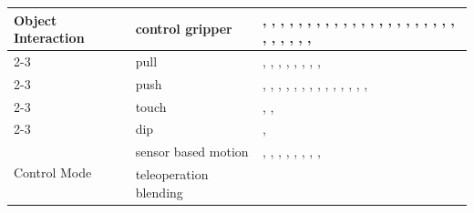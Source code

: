 \begin{table}[!h]
\begin{tabular}{|p{4cm}|p{5cm}|p{15cm}|}
\hline
\multirow{5}{*}{\parbox{3cm}{Object Interaction}}
    & control gripper                 & \cite{Mitrevski2019LucyTT}, \cite{Zhao2025ACL}, \cite{Nguyen2012AutonomouslyLT}, \cite{Stckler2013IncreasingFO}, \cite{Andersen2017IntegrationOA}, \cite{Rodehutskors2015IntuitiveBT}, \cite{Pedersen2014IntuitiveSP}, \cite{Orsula2022LearningTG}, \cite{Pohl2024MAkEableMA}, \cite{Groth2013MultitaskingOC}, \cite{Toner2024PRFAP}, \cite{Zhao2025ReactiveWL}, \cite{Huang2023SkillTA}, \cite{Diab2020SkillMaNA}, \cite{Schwarz2018TeamNA}, \cite{Thakar2018TowardsTT}, \cite{Nagatani1996DesigningSA}, \cite{Nagatani1996DooropeningBO}, \cite{Choi2009HandIO}, \cite{Zsoldos2025TowardsRL}, \cite{Knobbe2022CorePI}, \cite{Akkaladevi2024TowardsAB}, \cite{Confente2025SkinMachineIW}, \cite{Lopes2026CARGOAM}, \cite{Wu2024InTW}, \cite{Williams2012ARA}, \cite{Shan2026DockAnywhereDV}, \cite{Shi2021MaximizingTU}, \cite{Zhang2025AgentWorldAI} \\
\cline{2-3}
    & pull                            & \cite{Huang2013BehaviorB}, \cite{Schmalstieg2023LearningHI}, \cite{Shi2012MobileRA}, \cite{Lim2008MultipleHC}, \cite{Diab2020SkillMaNA}, \cite{Huang2008ACB}, \cite{Petersson1999AHC}, \cite{Knobbe2022CorePI}, \cite{Zhang2025AgentWorldAI} \\
\cline{2-3}
    & push                            & \cite{Weser2009AutonomousPF}, \cite{Li2022BEHAVIOR1KAB}, \cite{Schmalstieg2023LearningHI}, \cite{Shi2012MobileRA}, \cite{Lim2008MultipleHC}, \cite{Huang2008ACB}, \cite{Kotecha2024AHM}, \cite{Watanabe2024ImprovingRS}, \cite{Gupta2025PreciseMM}, \cite{Wu2024InTW}, \cite{Caro2025PushSN}, \cite{Williams2012ARA}, \cite{Shi2021MaximizingTU}, \cite{Watanabe2025IntegratingBP}, \cite{Zhang2025AgentWorldAI} \\
\cline{2-3}
    & touch                           & \cite{Orsula2022LearningTG}, \cite{Gller2024APB}, \cite{Fu2024MobileAL} \\
\cline{2-3}
    & dip                             & \cite{Li2022BEHAVIOR1KAB}, \cite{Knobbe2022CorePI} \\
\hline
\multirow{2}{*}{\parbox{2cm}{Control Mode}}
    & sensor based motion             & \cite{Tsay2018BehavioristicIP}, \cite{Shi2012MobileRA}, \cite{Deng2017ReinforcementLO}, \cite{Li2017ReinforcementLO}, \cite{Peng2024RevolutionizingBD}, \cite{Wasik2002AFB}, \cite{Petersson1999AHC}, \cite{MacKenzie1996BehaviorbasedMM}, \cite{Beetz2011GeneralityAL} \\
\cline{2-3}
    & teleoperation blending          & \cite{Maeda2022BlendingPP} \\

\end{tabular}
\end{table}
